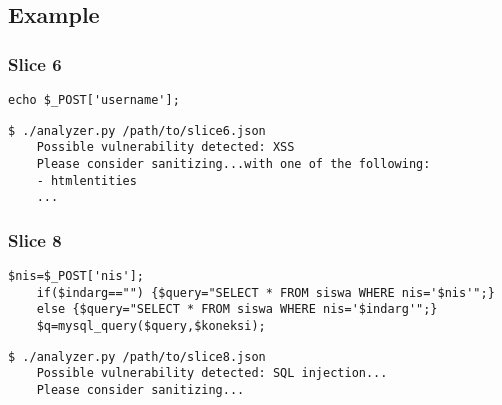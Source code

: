 \subsection*{Example}
\label{sec:experimental.example}


\subsubsection*{Slice 6}
\label{sec:experimental.example.slice06}

\begin{lstlisting}[label={php.slice06},
        title={slice6.php}]
    echo $_POST['username'];
\end{lstlisting}

\begin{lstlisting}[label={out.example.slice06},
        caption={Shortened example XSS vulnerable slice analysis output}]
    $ ./analyzer.py /path/to/slice6.json
    Possible vulnerability detected: XSS
    Please consider sanitizing...with one of the following:
    - htmlentities
    ...
\end{lstlisting}

\subsubsection*{Slice 8}
\label{sec:experimental.example.slice08}

\begin{lstlisting}[label={php.slice08},
        title={slice8.php}]
    $nis=$_POST['nis'];
    if($indarg=="") {$query="SELECT * FROM siswa WHERE nis='$nis'";}
    else {$query="SELECT * FROM siswa WHERE nis='$indarg'";}
    $q=mysql_query($query,$koneksi);
\end{lstlisting}

\begin{lstlisting}[label={out.example.slice08},
        caption={Shortened example SQLI vulnerable slice analysis output}]
    $ ./analyzer.py /path/to/slice8.json
    Possible vulnerability detected: SQL injection...
    Please consider sanitizing...
\end{lstlisting}

\lstset{basicstyle=\small\ttfamily}
